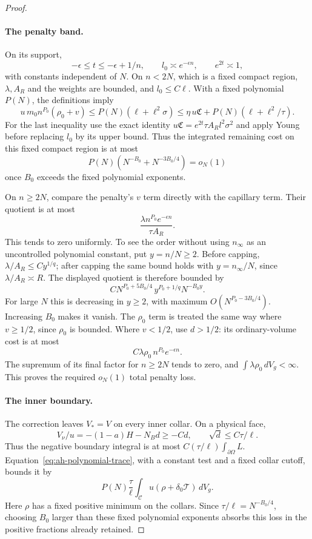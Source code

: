 \begin{proof}
\paragraph{The penalty band.}
On its support,
\[
 -\epsilon\le t\le-\epsilon+1/n,\qquad
 l_0\asymp e^{-\epsilon n},\qquad e^{2t}\asymp1,
\]
with constants independent of \(N\).
On \(n<2N\), which is a fixed compact region, \(\lambda,A_R\)
and the weights are bounded, and \(l_0\le C\ell\).
With a fixed polynomial \(P(N)\), the definitions imply
\[
 u\,m_0n^{P_0}(\rho_0+v)
 \le P(N)(\ell+\ell^2\sigma)
 \le\eta\,u\mathfrak C
              +P(N)(\ell+\ell^2/\tau).
\]
For the last inequality use the exact identity
\(u\mathfrak C=e^{2t}\tau A_R l^2\sigma^2\)
and apply Young before replacing \(l_0\) by its upper bound.
Thus the integrated remaining cost on this fixed compact region
is at most
\[
 P(N)(N^{-B_0}+N^{-3B_0/4})=o_N(1)
\]
once \(B_0\) exceeds the fixed polynomial exponents.

On \(n\ge2N\), compare the penalty's \(v\) term directly with
the capillary term. Their quotient is at most
\[
 \frac{\lambda n^{P_0}e^{-\epsilon n}}{\tau A_R}.
\]
This tends to zero uniformly. To see the order without using
\(n_\infty\) as an uncontrolled polynomial constant, put \(y=n/N\ge2\).
Before capping, \(\lambda/A_R\le C y^{1/q}\); after capping the same
bound holds with \(y=n_\infty/N\), since \(\lambda/A_R\asymp R\).
The displayed quotient is therefore bounded by
\[
 C N^{P_0+5B_0/4}\,y^{P_0+1/q}N^{-B_0y}.
\]
For large \(N\) this is decreasing in \(y\ge2\), with maximum
\(O(N^{P_0-3B_0/4})\). Increasing \(B_0\) makes it vanish.
The \(\rho_0\) term is treated the same way where \(v\ge1/2\),
since \(\rho_0\) is bounded. Where \(v<1/2\), use \(d>1/2\):
its ordinary-volume cost is at most
\[
 C\lambda\rho_0\, n^{P_0}e^{-\epsilon n}.
\]
The supremum of its final factor for \(n\ge2N\) tends to zero,
and \(\int\lambda\rho_0\,dV_g<\infty\).
This proves the required \(o_N(1)\) total penalty loss.

\paragraph{The inner boundary.}
The correction leaves \(V_*=V\) on every inner collar.
On a physical face,
\[
 V_\nu/u=-(1-a)H-N_Bd\ge-Cd,\qquad
 \sqrt d\le C\tau/\ell .
\]
Thus the negative boundary integral is at most
\(C(\tau/\ell)\int_{\partial\Omega}L\).
Equation~\eqref{eq:ah-polynomial-trace}, with a constant test and
a fixed collar cutoff, bounds it by
\[
 P(N)\frac{\tau}{\ell}
       \int_{\mathcal C}u(\rho+\delta_0\mathcal T)\,dV_g.
\]
Here \(\rho\) has a fixed positive minimum on the collars.
Since \(\tau/\ell=N^{-B_0/4}\), choosing \(B_0\) larger than these
fixed polynomial exponents absorbs this loss in the positive
fractions already retained.


\end{proof}
